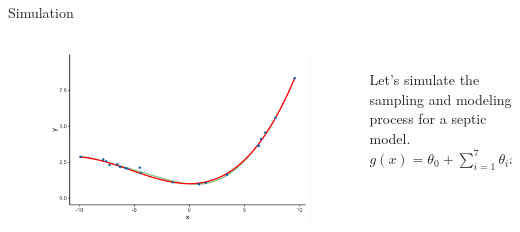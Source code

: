 \documentclass[aspectratio=169]{../latex_main/tntbeamer}  %
\begin{document}
	\begin{frame}[c]{Simulation}
	  \begin{columns}
	      \begin{column}{.6\textwidth}
	           \begin{figure}
	               \includegraphics[scale=.5]{Bild12}
	           \end{figure} 
	      \end{column}
	      
	      \begin{column}{.4\textwidth}
	      \\
	      \bigskip
	      \bigskip
	      \bigskip
	           Let’s simulate the sampling and modeling process for a septic model.\\
	            $g(x) = \theta_0 + \sum\limits_{i=1}^7 \theta_ix^i$
	      \end{column}
	  \end{columns}
	\end{frame}
	
\end{document}
